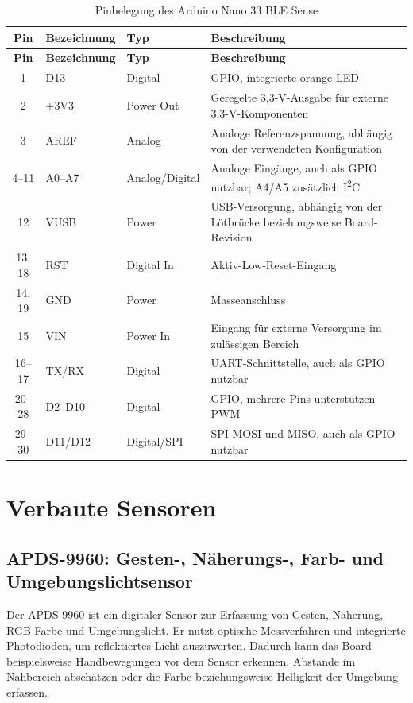 \begin{longtable}{|c|p{2.5cm}|p{3cm}|p{6.5cm}|}
	\caption{Pinbelegung des Arduino Nano 33 BLE Sense}
	\label{tab:Pinbelegung} \\
	\hline
	\textbf{Pin} & \textbf{Bezeichnung} & \textbf{Typ} & \textbf{Beschreibung} \\
	\hline
	\endfirsthead
	\hline
	\textbf{Pin} & \textbf{Bezeichnung} & \textbf{Typ} & \textbf{Beschreibung} \\
	\hline
	\endhead
	1 & D13 & Digital & GPIO, integrierte orange LED \\
	\hline
	2 & +3V3 & Power Out & Geregelte 3,3-V-Ausgabe für externe 3,3-V-Komponenten \\
	\hline
	3 & AREF & Analog & Analoge Referenzspannung, abhängig von der verwendeten Konfiguration \\
	\hline
	4--11 & A0--A7 & Analog/Digital & Analoge Eingänge, auch als GPIO nutzbar; A4/A5 zusätzlich I\textsuperscript{2}C \\
	\hline
	12 & VUSB & Power & USB-Versorgung, abhängig von der Lötbrücke beziehungsweise Board-Revision \\
	\hline
	13, 18 & RST & Digital In & Aktiv-Low-Reset-Eingang \\
	\hline
	14, 19 & GND & Power & Masseanschluss \\
	\hline
	15 & VIN & Power In & Eingang für externe Versorgung im zulässigen Bereich \\
	\hline
	16--17 & TX/RX & Digital & UART-Schnittstelle, auch als GPIO nutzbar \\
	\hline
	20--28 & D2--D10 & Digital & GPIO, mehrere Pins unterstützen PWM \\
	\hline
	29--30 & D11/D12 & Digital/SPI & SPI MOSI und MISO, auch als GPIO nutzbar \\
	\hline
\end{longtable}

\section{Verbaute Sensoren}

\subsection{APDS-9960: Gesten-, Näherungs-, Farb- und Umgebungslichtsensor}

Der APDS-9960 ist ein digitaler Sensor zur Erfassung von Gesten, Näherung, RGB-Farbe und Umgebungslicht. Er nutzt optische Messverfahren und integrierte Photodioden, um reflektiertes Licht auszuwerten. Dadurch kann das Board beispielsweise Handbewegungen vor dem Sensor erkennen, Abstände im Nahbereich abschätzen oder die Farbe beziehungsweise Helligkeit der Umgebung erfassen.

